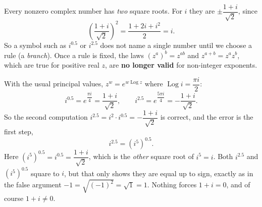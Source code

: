 Every nonzero complex number has \emph{two} square roots. For $i$ they are $\pm\dfrac{1+i}{\sqrt2}$, since
\[
\left(\dfrac{1+i}{\sqrt2}\right)^2=\dfrac{1+2i+i^2}{2}=i .
\]
So a symbol such as $i^{0.5}$ or $i^{2.5}$ does not name a single number until we choose a rule (a \emph{branch}). Once a rule is fixed, the laws $\left(z^a\right)^b=z^{ab}$ and $z^{a+b}=z^az^b$, which are true for positive real $z$, are \textbf{no longer valid} for non-integer exponents.

With the usual principal values, $z^w=e^{w\operatorname{Log}z}$ where $\operatorname{Log}i=\dfrac{\pi i}{2}$:
\[
i^{0.5}=e^{\dfrac{\pi i}{4}}=\dfrac{1+i}{\sqrt2},\qquad i^{2.5}=e^{\dfrac{5\pi i}{4}}=-\dfrac{1+i}{\sqrt2}.
\]
So the second computation $i^{2.5}=i^2\cdot i^{0.5}=-\dfrac{1+i}{\sqrt2}$ is correct, and the error is the first step,
\[
i^{2.5}=\left(i^5\right)^{0.5}.
\]
Here $\left(i^5\right)^{0.5}=i^{0.5}=\dfrac{1+i}{\sqrt2}$, which is the \emph{other} square root of $i^5=i$. Both $i^{2.5}$ and $\left(i^5\right)^{0.5}$ square to $i$, but that only shows they are equal up to sign, exactly as in the false argument $-1=\sqrt{(-1)^2}=\sqrt1=1$. Nothing forces $1+i=0$, and of course $1+i\ne0$.
